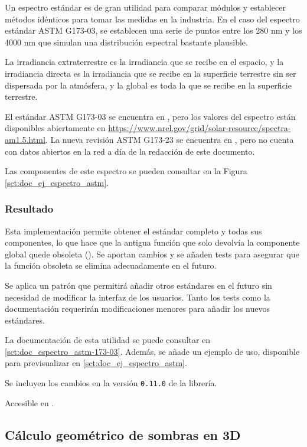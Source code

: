 Un espectro estándar es de gran utilidad para comparar módulos y establecer métodos idénticos para tomar las medidas en la industria. En el caso del espectro estándar ASTM G173-03, se establecen una serie de puntos entre los 280 nm y los 4000 nm que simulan una distribución espectral bastante plausible.

La irradiancia extraterrestre es la irradiancia que se recibe en el espacio, y la irradiancia directa es la irradiancia que se recibe en la superficie terrestre sin ser dispersada por la atmósfera, y la global es toda la que se recibe en la superficie terrestre.

El estándar ASTM G173-03 se encuentra en \cite{astm_g173-03}, pero los valores del espectro están disponibles abiertamente en \url{https://www.nrel.gov/grid/solar-resource/spectra-am1.5.html}.
La nueva revisión ASTM G173-23 se encuentra en \cite{astm_g173-23}, pero no cuenta con datos abiertos en la red a día de la redacción de este documento.

Las componentes de este espectro se pueden consultar en la Figura \ref{sct:doc_ej_espectro_astm}.

\subsubsection{Resultado}

Esta implementación permite obtener el estándar completo y todas sus componentes, lo que hace que la antigua función que solo devolvía la componente global quede obsoleta (). Se aportan cambios y se añaden tests para asegurar que la función obsoleta se elimina adecuadamente en el futuro.

Se aplica un patrón que permitirá añadir otros estándares en el futuro sin necesidad de modificar la interfaz de los usuarios. Tanto los tests como la documentación requerirán modificaciones menores para añadir los nuevos estándares.

La documentación de esta utilidad se puede consultar en \ref{sct:doc_espectro_astm-173-03}. Además, se añade un ejemplo de uso, disponible para previsualizar en \ref{sct:doc_ej_espectro_astm}.

Se incluyen los cambios en la versión \texttt{0.11.0} de la librería.

Accesible en .

\subsection{Cálculo geométrico de sombras en 3D}


